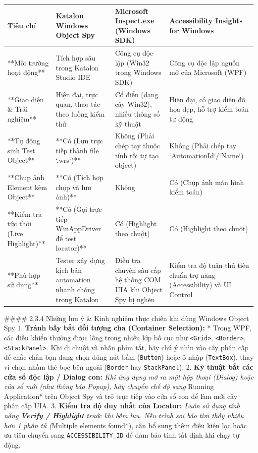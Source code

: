 {\begin{table}[H]
\centering
\begin{tabular}{|l|l|l|l|}
\hline
\textbf{Tiêu chí} & \textbf{Katalon Windows Object Spy} & \textbf{Microsoft Inspect.exe (Windows SDK)} & \textbf{Accessibility Insights for Windows} \\ \hline
**Môi trường hoạt động** & Tích hợp sâu trong Katalon Studio IDE & Công cụ độc lập (Win32 trong Windows SDK) & Công cụ độc lập nguồn mở của Microsoft (WPF) \\ \hline
**Giao diện \& Trải nghiệm** & Hiện đại, trực quan, thao tác theo luồng kiểm thử & Cổ điển (dạng cây Win32), nhiều thông số kỹ thuật & Hiện đại, có giao diện đồ họa đẹp, hỗ trợ kiểm toán tự động \\ \hline
**Tự động sinh Test Object** & **Có (Lưu trực tiếp thành file `.wrs`)** & Không (Phải chép tay thuộc tính rồi tự tạo object) & Không (Phải chép tay `AutomationId`/`Name`) \\ \hline
**Chụp ảnh Element kèm Object** & **Có (Tích hợp chụp và lưu ảnh)** & Không & Có (Chụp ảnh màn hình kiểm toán) \\ \hline
**Kiểm tra tức thời (Live Highlight)** & **Có (Gọi trực tiếp WinAppDriver để test locator)** & Có (Highlight theo chuột) & Có (Highlight theo chuột) \\ \hline
**Phù hợp sử dụng** & Tester xây dựng kịch bản automation nhanh chóng trong Katalon & Điều tra chuyên sâu cấp hệ thống COM UIA khi Object Spy bị nghẽn & Kiểm tra độ tuân thủ tiêu chuẩn trợ năng (Accessibility) và UI Control \\ \hline
\end{tabular}
\end{table}




#### 2.3.4 Những lưu ý & Kinh nghiệm thực chiến khi dùng Windows Object Spy
1. \textbf{Tránh bẫy bắt đối tượng cha (Container Selection):}
   * Trong WPF, các điều khiển thường được lồng trong nhiều lớp bố cục như \texttt{<Grid>}, \texttt{<Border>}, \texttt{<StackPanel>}. Khi di chuột và nhấn phím tắt, hãy chú ý nhìn vào cây phân cấp để chắc chắn bạn đang chọn đúng nút bấm (\texttt{Button}) hoặc ô nhập (\texttt{TextBox}), thay vì chọn nhầm thẻ bọc bên ngoài (\texttt{Border} hay \texttt{StackPanel}).
2. \textbf{Kỹ thuật bắt các cửa sổ độc lập / Dialog con:}
   \textit{ Khi ứng dụng mở ra một hộp thoại (Dialog) hoặc cửa sổ mới (như thông báo Popup), hãy chuyển chế độ sang }Running Application* trên Object Spy và trỏ trực tiếp vào cửa sổ con để làm mới cây phân cấp UIA.
3. \textbf{Kiểm tra độ duy nhất của Locator:}
   \textit{ Luôn sử dụng tính năng \textbf{Verify / Highlight} trước khi bấm lưu. Nếu trình soi báo tìm thấy nhiều hơn 1 phần tử (}Multiple elements found*), cần bổ sung thêm điều kiện lọc hoặc ưu tiên chuyển sang \texttt{ACCESSIBILITY_ID} để đảm bảo tính tất định khi chạy tự động.

}
